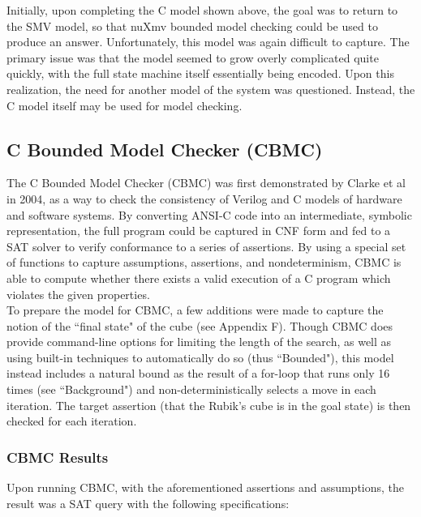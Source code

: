 \documentclass{article}
\begin{document}
\noindent Initially, upon completing the C model shown above, the goal was to return to the SMV model, so that nuXmv bounded model checking could be used to produce an answer. Unfortunately, this model was again difficult to capture. The primary issue was that the model seemed to grow overly complicated quite quickly, with the full state machine itself essentially being encoded. Upon this realization, the need for another model of the system was questioned. Instead, the C model itself may be used for model checking.

\subsection {C Bounded Model Checker (CBMC)}

The C Bounded Model Checker (CBMC) was first demonstrated by Clarke et al in 2004, as a way to check the consistency of Verilog and C models of hardware and software systems. By converting ANSI-C code into an intermediate, symbolic representation, the full program could be captured in CNF form and fed to a SAT solver to verify conformance to a series of assertions. By using a special set of functions to capture assumptions, assertions, and nondeterminism, CBMC is able to compute whether there exists a valid execution of a C program which violates the given properties. \\

\noindent To prepare the model for CBMC, a few additions were made to capture the notion of the ``final state" of the cube (see Appendix F). Though CBMC does provide command-line options for limiting the length of the search, as well as using built-in techniques to automatically do so (thus ``Bounded"), this model instead includes a natural bound as the result of a for-loop that runs only 16 times (see ``Background") and non-deterministically selects a move in each iteration. The target assertion (that the Rubik's cube is in the goal state) is then checked for each iteration. 


\subsubsection {CBMC Results}

Upon running CBMC, with the aforementioned assertions and assumptions, the result was a SAT query with the following specifications:
\end{document}
